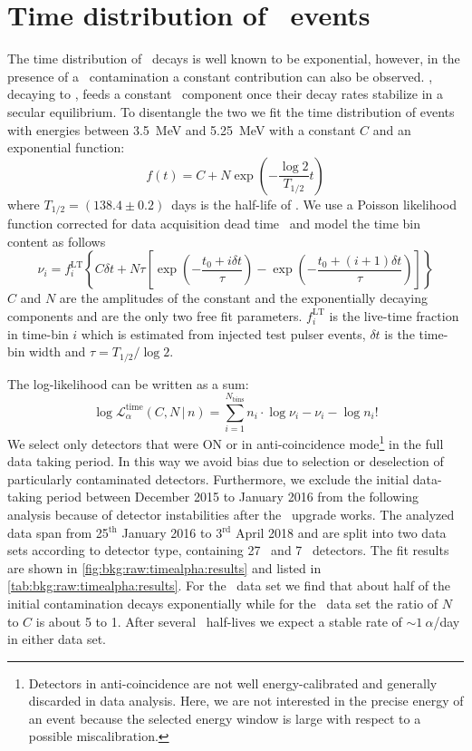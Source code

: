 
\chapter{\texorpdfstring{Time distribution of \a\ events}{Time distribution of alpha-events}}%
\label{apdx:timealpha}

The time distribution of \Po\ decays is well known to be exponential, however, in the
presence of a \Pbl\ contamination a constant contribution can also be observed. \Pbl,
decaying to \Po, feeds a constant \Po\ component once their decay rates stabilize in a
secular equilibrium. To disentangle the two we fit the time distribution of events with
energies between 3.5~MeV and 5.25~MeV with a constant $C$ and an exponential function:
\[
  f(t) = C + N \exp\left( - \frac{\log2}{T_{1/2}}t \right)
\]
where $T_{1/2}=(138.4\pm0.2)$~days is the half-life of \Po. We use a Poisson likelihood
function corrected for data acquisition dead time~\cite{Cleveland1983} and model the time
bin content as follows
\[
  \nu_i = f_i^{\mathrm{LT}}
  \left\{ C \delta t + N \tau
    \left[
      \exp\left( -\frac{t_0 + i \delta t}{\tau} \right)  -
      \exp\left( -\frac{t_0 + (i+1) \delta t}{\tau} \right)
    \right]
  \right\}
\]
$C$ and $N$ are the amplitudes of the constant and the exponentially decaying components
and are the only two free fit parameters.  $f_i^{\mathrm{LT}}$ is the live-time fraction
in time-bin $i$ which is estimated from injected test pulser events, $\delta t$ is the
time-bin width and $\tau = T_{1/2} / \log2$.

The log-likelihood can be written as a sum:
\[
  \log \mathcal{L}_\alpha^\text{time}(C,N \,|\, n) =
  \sum_{i=1}^{N_\text{bins}} n_i \cdot
  \log\nu_i - \nu_i - \log n_i!
\]
We select only detectors that were ON or in anti-coincidence mode\footnote{Detectors in
anti-coincidence are not well energy-calibrated and generally discarded in data analysis.
Here, we are not interested in the precise energy of an event because the selected energy
window is large with respect to a possible miscalibration.} in the full data taking
period. In this way we avoid bias due to selection or deselection of particularly
contaminated detectors. Furthermore, we exclude the initial data-taking period between
December 2015 to January 2016 from the following analysis because of detector
instabilities after the \phasetwo\ upgrade works. The analyzed data span from
25$^\text{th}$ January 2016 to 3$^\text{rd}$ April 2018 and are split into two data sets
according to detector type, containing 27 \bege\ and 7 \scoax\ detectors. The fit results
are shown in \autoref{fig:bkg:raw:timealpha:results} and listed in
\cref{tab:bkg:raw:timealpha:results}. For the \bege\ data set we find that about half of the
initial contamination decays exponentially while for the \scoax\ data set the ratio of $N$
to $C$ is about 5 to 1. After several \Po\ half-lives we expect a stable rate of
$\sim1~\alpha$/day in either data set.

